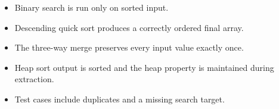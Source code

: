 \begin{verification}
\begin{itemize}
  \item Binary search is run only on sorted input.
  \item Descending quick sort produces a correctly ordered final array.
  \item The three-way merge preserves every input value exactly once.
  \item Heap sort output is sorted and the heap property is maintained during extraction.
  \item Test cases include duplicates and a missing search target.
\end{itemize}
\end{verification}

